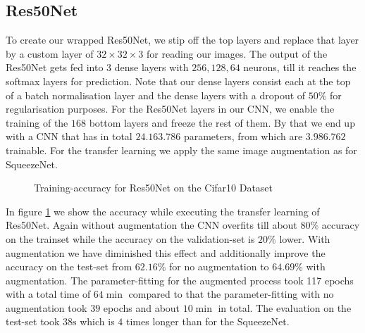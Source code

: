 \documentclass[11pt]{article}
\begin{document}
\subsection{Res50Net}
To create our wrapped Res50Net, we stip off the top layers and replace that layer by a custom layer of $32\times 32 \times 3$ for reading our images. The output of the Res50Net gets fed into $3$ dense layers with $256, 128, 64$ neurons, till it reaches the softmax layers for prediction. Note that our dense layers consist each at the top of a batch normalisation layer and the dense layers with a dropout of $50\%$ for regularisation purposes. For the Res50Net layers in our CNN, we enable the training of the $168$ bottom layers and freeze the rest of them. By that we end up with a CNN that has in total $24.163.786$ parameters, from which are $3.986.762$ trainable. For the transfer learning we apply the same image augmentation as for SqueezeNet.

\begin{figure}
\centering
{}
  \hfill
  \hfill
\caption{Training-accuracy for Res50Net on the Cifar10 Dataset}
\label{rescnn::3}
\end{figure}

In figure \ref{rescnn::3} we show the accuracy while executing the transfer learning of Res50Net. Again without augmentation the CNN overfits till about $80\%$ accuracy on the trainset while the accuracy on the validation-set is $20\%$ lower. With augmentation we have diminished this effect and additionally improve the accuracy on the test-set from $62.16\%$ for no augmentation to $64.69\%$ with augmentation. The parameter-fitting for the augmented process took 117 epochs with a total time of $64 \min$ compared to that the parameter-fitting with no augmentation took $39$ epochs and about $10 \min$ in total. The evaluation on the test-set took $38\text{s}$ which is  $4$ times longer than for the SqueezeNet.
\end{document}
